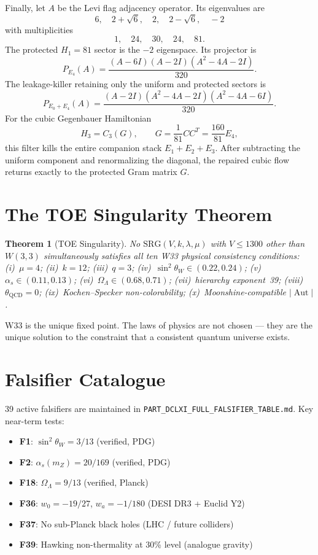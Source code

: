 \documentclass[12pt,a4paper]{article}
\newtheorem{theorem}{Theorem}[section]
\newcommand{\W}{W(3,3)}
\DeclareMathOperator{\Aut}{Aut}
\begin{document}
Finally, let $A$ be the Levi flag adjacency operator.  Its eigenvalues are
\[
6,\quad 2+\sqrt6,\quad 2,\quad 2-\sqrt6,\quad -2
\]
with multiplicities
\[
1,\quad24,\quad30,\quad24,\quad81.
\]
The protected $H_1=81$ sector is the $-2$ eigenspace.  Its projector is
\[
P_{E_4}(A)=
\frac{(A-6I)(A-2I)(A^2-4A-2I)}{320}.
\]
The leakage-killer retaining only the uniform and protected sectors is
\[
P_{E_0+E_4}(A)=
\frac{(A-2I)(A^2-4A-2I)(A^2-4A-6I)}{320}.
\]
For the cubic Gegenbauer Hamiltonian
\[
H_3=C_3(G),
\qquad
G=\frac1{81}CC^T=\frac{160}{81}E_4,
\]
this filter kills the entire companion stack $E_1+E_2+E_3$.  After subtracting
the uniform component and renormalizing the diagonal, the repaired cubic flow
returns exactly to the protected Gram matrix $G$.

\section{The TOE Singularity Theorem}
\label{sec:uniqueness}

\begin{theorem}[TOE Singularity]
No $\mathrm{SRG}(V,k,\lambda,\mu)$ with $V\leq 1300$ other than $\W$
simultaneously satisfies all ten W33 physical consistency conditions:
(i)~$\mu=4$;
(ii)~$k=12$;
(iii)~$q=3$;
(iv)~$\sin^2\theta_W\in(0.22,0.24)$;
(v)~$\alpha_s\in(0.11,0.13)$;
(vi)~$\Omega_\Lambda\in(0.68,0.71)$;
(vii)~hierarchy exponent~39;
(viii)~$\theta_{\mathrm{QCD}}=0$;
(ix)~Kochen--Specker non-colorability;
(x)~Moonshine-compatible $|\Aut|$.
\end{theorem}

W33 is the unique fixed point. The laws of physics are not
chosen --- they are the unique solution to the constraint that
a consistent quantum universe exists.

\section{Falsifier Catalogue}
\label{sec:falsifiers}

39 active falsifiers are maintained in
\texttt{PART\_DCLXI\_FULL\_FALSIFIER\_TABLE.md}.
Key near-term tests:
\begin{itemize}
  \item \textbf{F1}: $\sin^2\theta_W = 3/13$ \hfill(verified, PDG)
  \item \textbf{F2}: $\alpha_s(m_Z) = 20/169$ \hfill(verified, PDG)
  \item \textbf{F18}: $\Omega_\Lambda = 9/13$ \hfill(verified, Planck)
  \item \textbf{F36}: $w_0 = -19/27$, $w_a = -1/180$ \hfill(DESI DR3 + Euclid Y2)
  \item \textbf{F37}: No sub-Planck black holes \hfill(LHC / future colliders)
  \item \textbf{F39}: Hawking non-thermality at 30\% level \hfill(analogue gravity)
\end{itemize}
\end{document}
